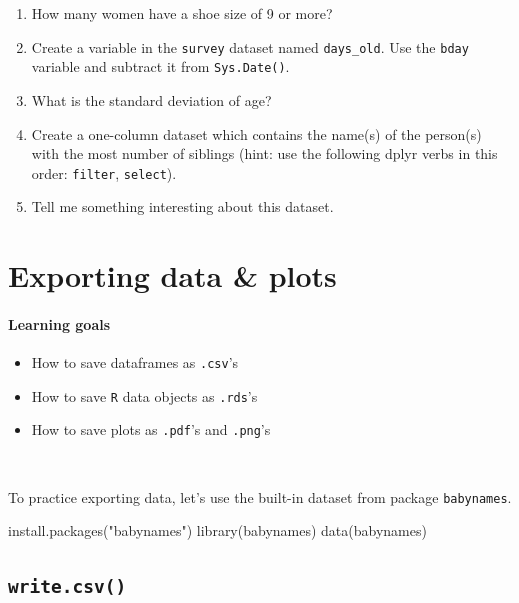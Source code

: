 \documentclass[
]{book}
\newenvironment{Shaded}{\begin{snugshade}}{\end{snugshade}}
\newcommand{\FunctionTok}[1]{\textcolor[rgb]{0.00,0.00,0.00}{#1}}
\newcommand{\NormalTok}[1]{#1}
\newcommand{\StringTok}[1]{\textcolor[rgb]{0.31,0.60,0.02}{#1}}
\providecommand{\tightlist}{%
  \setlength{\itemsep}{0pt}\setlength{\parskip}{0pt}}
\begin{document}
\begin{enumerate}
\item
  How many women have a shoe size of 9 or more?
\item
  Create a variable in the \texttt{survey} dataset named \texttt{days\_old}. Use the \texttt{bday} variable and subtract it from \texttt{Sys.Date()}.
\item
  What is the standard deviation of age?
\item
  Create a one-column dataset which contains the name(s) of the person(s) with the most number of siblings (hint: use the following dplyr verbs in this order: \texttt{filter}, \texttt{select}).
\item
  Tell me something interesting about this dataset.
\end{enumerate}

\hypertarget{exporting-data-plots}{%
\chapter{Exporting data \& plots}\label{exporting-data-plots}}

\hypertarget{learning-goals-11}{%
\subsubsection*{Learning goals}\label{learning-goals-11}}

\begin{itemize}
\tightlist
\item
  How to save dataframes as \texttt{.csv}'s
\item
  How to save \texttt{R} data objects as \texttt{.rds}'s
\item
  How to save plots as \texttt{.pdf}'s and \texttt{.png}'s
\end{itemize}

~

To practice exporting data, let's use the built-in dataset from package \texttt{babynames}.

\begin{Shaded}
\begin{Highlighting}[]
\FunctionTok{install.packages}\NormalTok{(}\StringTok{"babynames"}\NormalTok{)}
\FunctionTok{library}\NormalTok{(babynames)}
\FunctionTok{data}\NormalTok{(babynames)}
\end{Highlighting}
\end{Shaded}

\hypertarget{write.csv}{%
\section*{\texorpdfstring{\texttt{write.csv()}}{write.csv()}}\label{write.csv}}
\end{document}
